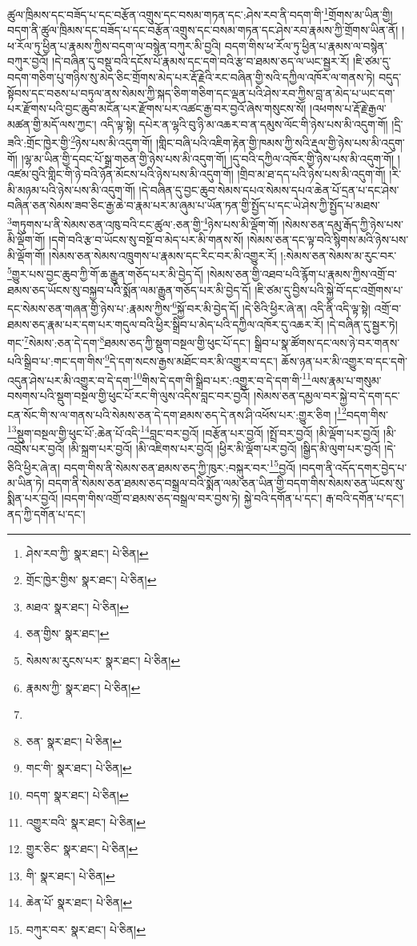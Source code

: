 ཚུལ་ཁྲིམས་དང་བཟོད་པ་དང་བརྩོན་འགྲུས་དང་བསམ་གཏན་དང་:ཤེས་རབ་ནི་བདག་གི་\footnote{ཤེས་རབ་ཀྱི་  སྣར་ཐང་།  པེ་ཅིན། }གྲོགས་མ་ཡིན་གྱི། བདག་ནི་ཚུལ་ཁྲིམས་དང་བཟོད་པ་དང་བརྩོན་འགྲུས་དང་བསམ་གཏན་དང་ཤེས་རབ་རྣམས་ཀྱི་གྲོགས་ཡིན་ནོ། །ཕ་རོལ་ཏུ་ཕྱིན་པ་རྣམས་ཀྱིས་བདག་ལ་བསྙེན་བཀུར་མི་བྱའི། བདག་གིས་ཕ་རོལ་ཏུ་ཕྱིན་པ་རྣམས་ལ་བསྙེན་བཀུར་བྱའོ། །དེ་བཞིན་དུ་བསྡུ་བའི་དངོས་པོ་རྣམས་དང་དགེ་བའི་རྩ་བ་ཐམས་ཅད་ལ་ཡང་སྦྱར་རོ། །ཇི་ཙམ་དུ་བདག་གཅིག་པུ་གཉིས་སུ་མེད་ཅིང་གྲོགས་མེད་པར་རྡོ་རྗེའི་རང་བཞིན་གྱི་སའི་དཀྱིལ་འཁོར་ལ་གནས་ཏེ། བདུད་སྟོབས་དང་བཅས་པ་བཏུལ་ནས་སེམས་ཀྱི་སྐད་ཅིག་གཅིག་དང་ལྡན་པའི་ཤེས་རབ་ཀྱིས་བླ་ན་མེད་པ་ཡང་དག་པར་རྫོགས་པའི་བྱང་ཆུབ་མངོན་པར་རྫོགས་པར་འཚང་རྒྱ་བར་བྱའོ་ཞེས་གསུངས་སོ། །འཕགས་པ་རྡོ་རྗེ་རྒྱལ་མཚན་གྱི་མདོ་ལས་ཀྱང་། འདི་ལྟ་སྟེ། དཔེར་ན་ལྷའི་བུ་ཉི་མ་འཆར་བ་ན་དམུས་ལོང་གི་ཉེས་པས་མི་འདུག་གོ། །དྲི་ཟའི་:གྲོང་ཁྱེར་གྱི་\footnote{གྲོང་ཁྱེར་གྱིས་  སྣར་ཐང་།  པེ་ཅིན། }ཉེས་པས་མི་འདུག་གོ། །གླིང་བཞི་པའི་འཇིག་རྟེན་གྱི་ཁམས་ཀྱི་སའི་རྡུལ་གྱི་ཉེས་པས་མི་འདུག་གོ། །ལྷ་མ་ཡིན་གྱི་དབང་པོ་སྒྲ་གཅན་གྱི་ཉེས་པས་མི་འདུག་གོ། །དུ་བའི་དཀྱིལ་འཁོར་གྱི་ཉེས་པས་མི་འདུག་གོ། །འཛམ་བུའི་གླིང་གི་ཉེ་བའི་ཉོན་མོངས་པའི་ཉེས་པས་མི་འདུག་གོ། །གྲིབ་མ་ཐ་དད་པའི་ཉེས་པས་མི་འདུག་གོ། །རི་མི་མཉམ་པའི་ཉེས་པས་མི་འདུག་གོ། །དེ་བཞིན་དུ་བྱང་ཆུབ་སེམས་དཔའ་སེམས་དཔའ་ཆེན་པོ་དྲན་པ་དང་ཤེས་བཞིན་ཅན་སེམས་ཟབ་ཅིང་རྒྱ་ཆེ་བ་རྣམ་པར་མ་ཞུམ་པ་ཡོན་ཏན་གྱི་སྤྱོད་པ་དང་ཡེ་ཤེས་ཀྱི་སྤྱོད་པ་མཐས་\footnote{མཐའ་  སྣར་ཐང་།  པེ་ཅིན། }གཏུགས་པ་ནི་སེམས་ཅན་འཁུ་བའི་ངང་ཚུལ་:ཅན་གྱི་\footnote{ཅན་གྱིས་  སྣར་ཐང་། }ཉེས་པས་མི་ལྡོག་གོ། །སེམས་ཅན་དམུ་རྒོད་ཀྱི་ཉེས་པས་མི་ལྡོག་གོ། །དགེ་བའི་རྩ་བ་ཡོངས་སུ་བསྔོ་བ་མེད་པར་མི་གནས་སོ། །སེམས་ཅན་དང་ལྟ་བའི་སྙིགས་མའི་ཉེས་པས་མི་ལྡོག་གོ། །སེམས་ཅན་སེམས་འཁྲུགས་པ་རྣམས་དང་རིང་བར་མི་འགྱུར་རོ། །:སེམས་ཅན་སེམས་མ་རུང་བར་\footnote{སེམས་མ་རུངས་པར་  སྣར་ཐང་།  པེ་ཅིན། }གྱུར་པས་བྱང་ཆུབ་ཀྱི་གོ་ཆ་རྒྱུན་གཅོད་པར་མི་བྱེད་དོ། །སེམས་ཅན་གྱི་འཐབ་པའི་རྙོག་པ་རྣམས་ཀྱིས་འགྲོ་བ་ཐམས་ཅད་ཡོངས་སུ་བསྐྱབ་པའི་སྨོན་ལམ་རྒྱུན་གཅོད་པར་མི་བྱེད་དོ། །ཇི་ཙམ་དུ་བྱིས་པའི་སྐྱེ་བོ་དང་འགྲོགས་པ་དང་སེམས་ཅན་གཞན་གྱི་ཉེས་པ་:རྣམས་ཀྱིས་\footnote{རྣམས་ཀྱི་  སྣར་ཐང་།  པེ་ཅིན། }སྐྱོ་བར་མི་བྱེད་དོ། །དེ་ཅིའི་ཕྱིར་ཞེ་ན། འདི་ནི་འདི་ལྟ་སྟེ། འགྲོ་བ་ཐམས་ཅད་རྣམ་པར་དག་པར་གདུལ་བའི་ཕྱིར་སྒྲིབ་པ་མེད་པའི་དཀྱིལ་འཁོར་དུ་འཆར་རོ། །དེ་བཞིན་དུ་སྦྱར་ཏེ། གང་\footnote{}སེམས་:ཅན་དེ་དག་\footnote{ཅན་  སྣར་ཐང་།  པེ་ཅིན། }ཐམས་ཅད་ཀྱི་སྡུག་བསྔལ་གྱི་ཕུང་པོ་དང་། སྒྲིབ་པ་སྣ་ཚོགས་དང་ལས་ཉེ་བར་གནས་པའི་སྒྲིབ་པ་:གང་དག་གིས་\footnote{གང་གི་  སྣར་ཐང་།  པེ་ཅིན། }དེ་དག་སངས་རྒྱས་མཐོང་བར་མི་འགྱུར་བ་དང་། ཆོས་ཉན་པར་མི་འགྱུར་བ་དང་དགེ་འདུན་ཤེས་པར་མི་འགྱུར་བ་དེ་དག་\footnote{བདག་  སྣར་ཐང་།  པེ་ཅིན། }གིས་དེ་དག་གི་སྒྲིབ་པར་:འགྱུར་བ་དེ་དག་གི་\footnote{འགྱུར་བའི་  སྣར་ཐང་།  པེ་ཅིན། }ལས་རྣམ་པ་གསུམ་བསགས་པའི་སྡུག་བསྔལ་གྱི་ཕུང་པོ་རང་གི་ལུས་འདིས་བླང་བར་བྱའོ། །སེམས་ཅན་དམྱལ་བར་སྐྱེ་བ་དེ་དག་དང་ངན་སོང་གི་ས་ལ་གནས་པའི་སེམས་ཅན་དེ་དག་ཐམས་ཅད་དེ་ནས་ཤི་འཕོས་པར་:གྱུར་ཅིག །\footnote{གྱུར་ཅིང་  སྣར་ཐང་།  པེ་ཅིན། }བདག་གིས་\footnote{གི་  སྣར་ཐང་།  པེ་ཅིན། }སྡུག་བསྔལ་གྱི་ཕུང་པོ་:ཆེན་པོ་འདི་\footnote{ཆེན་པོ་  སྣར་ཐང་།  པེ་ཅིན། }བླང་བར་བྱའོ། །བརྩོན་པར་བྱའོ། །སྤྲོ་བར་བྱའོ། །མི་ལྡོག་པར་བྱའོ། །མི་འབྲོས་པར་བྱའོ། །མི་སྐྲག་པར་བྱའོ། །མི་འཇིགས་པར་བྱའོ། །ཕྱིར་མི་ལྡོག་པར་བྱའོ། །སྒྱིད་མི་ལུག་པར་བྱའོ། །དེ་ཅིའི་ཕྱིར་ཞེ་ན། བདག་གིས་ནི་སེམས་ཅན་ཐམས་ཅད་ཀྱི་ཁུར་:བསྐུར་བར་\footnote{བཀུར་བར་  སྣར་ཐང་།  པེ་ཅིན། }བྱའོ། །བདག་ནི་འདོད་དགར་བྱེད་པ་མ་ཡིན་ཏེ། བདག་ནི་སེམས་ཅན་ཐམས་ཅད་བསྒྲལ་བའི་སྨོན་ལམ་ཅན་ཡིན་གྱི་བདག་གིས་སེམས་ཅན་ཡོངས་སུ་སྨིན་པར་བྱའོ། །བདག་གིས་འགྲོ་བ་ཐམས་ཅད་བསྒྲལ་བར་བྱས་ཏེ། སྐྱེ་བའི་དགོན་པ་དང་། རྒ་བའི་དགོན་པ་དང་། ནད་ཀྱི་དགོན་པ་དང་། 